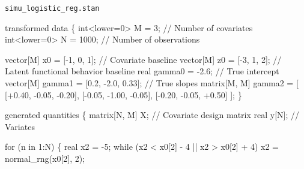 \documentclass[
  letterpaper,
  DIV=11,
  numbers=noendperiod]{scrartcl}
\newenvironment{Shaded}{\begin{snugshade}}{\end{snugshade}}
\newcommand{\CommentTok}[1]{\textcolor[rgb]{0.37,0.37,0.37}{#1}}
\newcommand{\ControlFlowTok}[1]{\textcolor[rgb]{0.00,0.23,0.31}{#1}}
\newcommand{\DataTypeTok}[1]{\textcolor[rgb]{0.68,0.00,0.00}{#1}}
\newcommand{\DecValTok}[1]{\textcolor[rgb]{0.68,0.00,0.00}{#1}}
\newcommand{\FloatTok}[1]{\textcolor[rgb]{0.68,0.00,0.00}{#1}}
\newcommand{\KeywordTok}[1]{\textcolor[rgb]{0.00,0.23,0.31}{#1}}
\newcommand{\NormalTok}[1]{\textcolor[rgb]{0.00,0.23,0.31}{#1}}
\begin{document}
\begin{codelisting}

\caption{\texttt{simu\_logistic\_reg.stan}}

\begin{Shaded}
\begin{Highlighting}[]
\KeywordTok{transformed data}\NormalTok{ \{}
  \DataTypeTok{int}\NormalTok{\textless{}}\KeywordTok{lower}\NormalTok{=}\DecValTok{0}\NormalTok{\textgreater{} M = }\DecValTok{3}\NormalTok{;         }\CommentTok{// Number of covariates}
  \DataTypeTok{int}\NormalTok{\textless{}}\KeywordTok{lower}\NormalTok{=}\DecValTok{0}\NormalTok{\textgreater{} N = }\DecValTok{1000}\NormalTok{;      }\CommentTok{// Number of observations}
  
  \DataTypeTok{vector}\NormalTok{[M] x0 = [{-}}\DecValTok{1}\NormalTok{, }\DecValTok{0}\NormalTok{, }\DecValTok{1}\NormalTok{]\textquotesingle{}; }\CommentTok{// Covariate baseline}
  \DataTypeTok{vector}\NormalTok{[M] z0 = [{-}}\DecValTok{3}\NormalTok{, }\DecValTok{1}\NormalTok{, }\DecValTok{2}\NormalTok{]\textquotesingle{}; }\CommentTok{// Latent functional behavior baseline}
  \DataTypeTok{real}\NormalTok{ gamma0 = {-}}\FloatTok{2.6}\NormalTok{;                      }\CommentTok{// True intercept}
  \DataTypeTok{vector}\NormalTok{[M] gamma1 = [}\FloatTok{0.2}\NormalTok{, {-}}\FloatTok{2.0}\NormalTok{, }\FloatTok{0.33}\NormalTok{]\textquotesingle{};   }\CommentTok{// True slopes}
  \DataTypeTok{matrix}\NormalTok{[M, M] gamma2 = [ [+}\FloatTok{0.40}\NormalTok{, {-}}\FloatTok{0.05}\NormalTok{, {-}}\FloatTok{0.20}\NormalTok{],}
\NormalTok{                          [{-}}\FloatTok{0.05}\NormalTok{, {-}}\FloatTok{1.00}\NormalTok{, {-}}\FloatTok{0.05}\NormalTok{],}
\NormalTok{                          [{-}}\FloatTok{0.20}\NormalTok{, {-}}\FloatTok{0.05}\NormalTok{, +}\FloatTok{0.50}\NormalTok{] ];}
\NormalTok{\}}

\KeywordTok{generated quantities}\NormalTok{ \{}
  \DataTypeTok{matrix}\NormalTok{[N, M] X; }\CommentTok{// Covariate design matrix}
  \DataTypeTok{real}\NormalTok{ y[N];      }\CommentTok{// Variates}

  \ControlFlowTok{for}\NormalTok{ (n }\ControlFlowTok{in} \DecValTok{1}\NormalTok{:N) \{}
    \DataTypeTok{real}\NormalTok{ x2 = {-}}\DecValTok{5}\NormalTok{;}
    \ControlFlowTok{while}\NormalTok{ (x2 \textless{} x0[}\DecValTok{2}\NormalTok{] {-} }\DecValTok{4}\NormalTok{ || x2 \textgreater{} x0[}\DecValTok{2}\NormalTok{] + }\DecValTok{4}\NormalTok{)}
\NormalTok{      x2 = normal\_rng(x0[}\DecValTok{2}\NormalTok{], }\DecValTok{2}\NormalTok{);}
    

\end{Highlighting}
\end{Shaded}
\end{codelisting}
\end{document}
